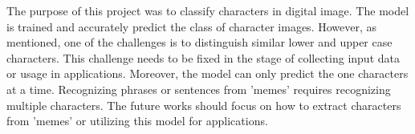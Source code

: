 The purpose of this project was to classify characters in digital image. The model is trained and accurately predict the class
of character images. However, as mentioned, one of the challenges is to distinguish similar lower and upper case characters. This
challenge needs to be fixed in the stage of collecting input data or usage in applications. Moreover, the model can only predict
the one characters at a time. Recognizing phrases or sentences from 'memes' requires recognizing multiple characters. The future works
should focus on how to extract characters from 'memes' or utilizing this model for applications.